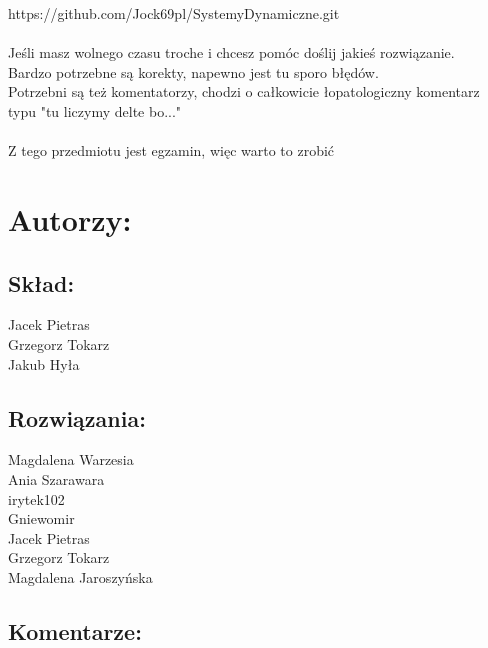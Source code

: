 \documentclass[a4paper,10pt]{article}
\begin{document}
\noindent https://github.com/Jock69pl/SystemyDynamiczne.git\\
\\
Jeśli masz wolnego czasu troche i chcesz pomóc doślij jakieś rozwiązanie.\\
Bardzo potrzebne są korekty, napewno jest tu sporo błędów.\\
Potrzebni są też komentatorzy, chodzi o całkowicie łopatologiczny komentarz typu "tu liczymy delte bo..."\\
\\
Z tego przedmiotu jest egzamin, więc warto to zrobić






 

\pagebreak
\section*{Autorzy:}

\subsection*{Skład:} 
Jacek Pietras\\
Grzegorz Tokarz\\
Jakub Hyła

\subsection*{Rozwiązania:} 
Magdalena Warzesia\\
Ania Szarawara\\
irytek102\\
Gniewomir\\
Jacek Pietras\\
Grzegorz Tokarz\\
Magdalena Jaroszyńska

\subsection*{Komentarze:} 
\end{document}
